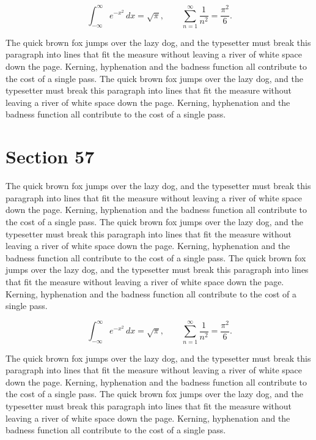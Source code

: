 \documentclass{article}
\begin{document}
\begin{equation}
\int_{-\infty}^{\infty} e^{-x^{2}}\,dx = \sqrt{\pi}, \qquad
\sum_{n=1}^{\infty} \frac{1}{n^{2}} = \frac{\pi^{2}}{6}.
\end{equation}

The quick brown fox jumps over the lazy dog, and the typesetter must break this paragraph into lines that fit the measure without leaving a river of white space down the page. Kerning, hyphenation and the badness function all contribute to the cost of a single pass. The quick brown fox jumps over the lazy dog, and the typesetter must break this paragraph into lines that fit the measure without leaving a river of white space down the page. Kerning, hyphenation and the badness function all contribute to the cost of a single pass. 
\section{Section 57}
The quick brown fox jumps over the lazy dog, and the typesetter must break this paragraph into lines that fit the measure without leaving a river of white space down the page. Kerning, hyphenation and the badness function all contribute to the cost of a single pass. The quick brown fox jumps over the lazy dog, and the typesetter must break this paragraph into lines that fit the measure without leaving a river of white space down the page. Kerning, hyphenation and the badness function all contribute to the cost of a single pass. The quick brown fox jumps over the lazy dog, and the typesetter must break this paragraph into lines that fit the measure without leaving a river of white space down the page. Kerning, hyphenation and the badness function all contribute to the cost of a single pass. 

\begin{equation}
\int_{-\infty}^{\infty} e^{-x^{2}}\,dx = \sqrt{\pi}, \qquad
\sum_{n=1}^{\infty} \frac{1}{n^{2}} = \frac{\pi^{2}}{6}.
\end{equation}

The quick brown fox jumps over the lazy dog, and the typesetter must break this paragraph into lines that fit the measure without leaving a river of white space down the page. Kerning, hyphenation and the badness function all contribute to the cost of a single pass. The quick brown fox jumps over the lazy dog, and the typesetter must break this paragraph into lines that fit the measure without leaving a river of white space down the page. Kerning, hyphenation and the badness function all contribute to the cost of a single pass. 
\end{document}
